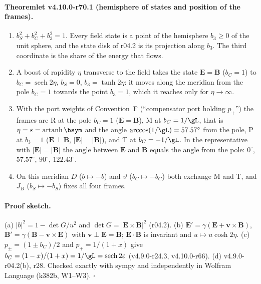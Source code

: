 \paragraph{Theoremlet v4.10.0-r70.1 (hemisphere of states and position of the frames).}
\begin{enumerate}[leftmargin=2em]
\item[(a)] \(b_S^2+b_C^2+b_3^2=1\).  Every field state is a point of the hemisphere \(b_3\ge0\) of the unit sphere, and the state disk of
r04.2 is its projection along \(b_3\).  The third coordinate is the share of the energy that flows.
\item[(b)] A boost of rapidity \(\eta\) transverse to the field takes the state \(\mathbf E=\mathbf B\) (\(b_C=1\)) to
\(b_C=\operatorname{sech}2\eta\), \(b_S=0\), \(b_3=\tanh2\eta\): it moves along the meridian from the pole \(b_C=1\) towards the point
\(b_3=1\), which it reaches only for \(\eta\to\infty\).
\item[(c)] With the port weights of Convention~F (``compensator port holding \(p_+\)'') the frames are R at the pole \(b_C=1\)
(\(\mathbf E=\mathbf B\)), M at \(b_C=1/\gL\), that is \(\eta=\varepsilon=\operatorname{artanh}\bsym\) and the angle
\(\arccos(1/\gL)=57.57^\circ\) from the pole, P at \(b_3=1\) (\(\mathbf E\perp\mathbf B\), \(|\mathbf E|=|\mathbf B|\)), and T at \(b_C=-1/\gL\).
In the representative with \(|\mathbf E|=|\mathbf B|\) the angle between \(\mathbf E\) and \(\mathbf B\) equals the angle from the pole:
\(0^\circ\), \(57.57^\circ\), \(90^\circ\), \(122.43^\circ\).
\item[(d)] On this meridian \(D\) (\(b\mapsto-b\)) and \(\vartheta\) (\(b_C\mapsto-b_C\)) both exchange M and T, and \(J_B\)
(\(b_S\mapsto-b_S\)) fixes all four frames.
\end{enumerate}

\paragraph{Proof sketch.}
(a) \(|b|^2=1-\det G/u^2\) and \(\det G=|\mathbf E\times\mathbf B|^2\) (r04.2).  (b) \(\mathbf E'=\gamma(\mathbf E+\mathbf v\times\mathbf B)\),
\(\mathbf B'=\gamma(\mathbf B-\mathbf v\times\mathbf E)\) with \(\mathbf v\perp\mathbf E=\mathbf B\); \(\mathbf E\cdot\mathbf B\) is invariant and
\(u\mapsto u\cosh2\eta\).  (c) \(p_\pm=(1\pm b_C)/2\) and \(p_+=1/(1+x)\) give \(b_C=(1-x)/(1+x)=1/\gL=\operatorname{sech}2\varepsilon\)
(v4.9.0-r24.3, v4.10.0-r66).  (d) v4.9.0-r04.2(b), r28.  Checked exactly with sympy and independently in Wolfram Language (k382b, W1--W3).
\(\square\)

